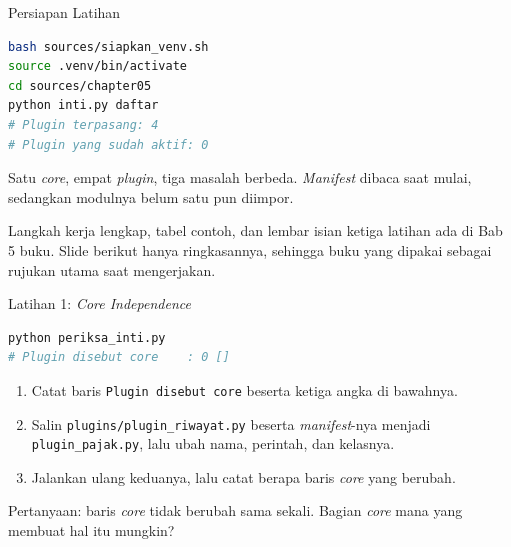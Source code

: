 \documentclass[aspectratio=169, table, 12pt]{beamer}
\begin{document}
\begin{frame}[fragile]{{\Large Persiapan Latihan}}
  \vspace{5pt}
\begin{lstlisting}[language=bash]
bash sources/siapkan_venv.sh
source .venv/bin/activate
cd sources/chapter05
python inti.py daftar
# Plugin terpasang: 4
# Plugin yang sudah aktif: 0
\end{lstlisting}

  \vspace{8pt}
  {\small Satu \textit{core}, empat \textit{plugin}, tiga masalah berbeda.
  \textit{Manifest} dibaca saat mulai, sedangkan modulnya belum satu pun
  diimpor.}

  \vspace{4pt}
  {\small Langkah kerja lengkap, tabel contoh, dan lembar isian ketiga latihan
  ada di Bab 5 buku. Slide berikut hanya ringkasannya, sehingga buku yang
  dipakai sebagai rujukan utama saat mengerjakan.}
\end{frame}

\begin{frame}[fragile]{{\Large Latihan 1: \textit{Core Independence}}}
  \vspace{3pt}
\begin{lstlisting}[language=bash]
python periksa_inti.py
# Plugin disebut core    : 0 []
\end{lstlisting}

  \vspace{3pt}
  \begin{enumerate}\small
    \item Catat baris \texttt{Plugin disebut core} beserta ketiga angka di
          bawahnya.
    \item Salin \texttt{plugins/plugin\_riwayat.py} beserta \textit{manifest}-nya menjadi
          \texttt{plugin\_pajak.py}, lalu ubah nama, perintah, dan kelasnya.
    \item Jalankan ulang keduanya, lalu catat berapa baris \textit{core} yang berubah.
  \end{enumerate}

  \vspace{3pt}
  {\small Pertanyaan: baris \textit{core} tidak berubah sama sekali. Bagian \textit{core} mana
  yang membuat hal itu mungkin?}
\end{frame}
\end{document}
